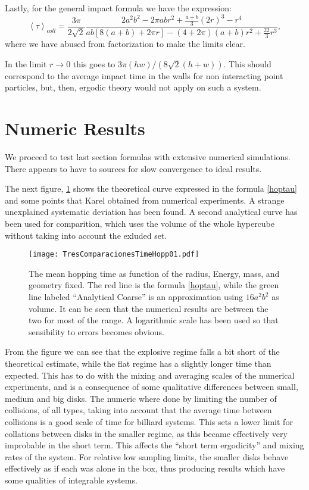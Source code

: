 \documentclass[a4paper,10pt, jcp, aps, preprint]{revtex4-1}
\newcommand{\mean}[1]{\left \langle #1 \right \rangle}
\begin{document}
Lastly, for the general impact formula we have the expression:
\begin{equation}
 \mean{\tau}_{coll} = 	
\frac{3 \pi}{2\sqrt{2}}
\frac { 2a^{2} b^{2}  -  2\pi a b r^{2} + \frac{a+b}{3}(2r)^3 - r^4}
{ab[8(a+b)+2\pi r]- (4+2\pi)(a+b)r^2+\frac{22}{3} r^3},
\end{equation}
where we have abused from factorization to make the limits clear.

In the limit $r\rightarrow 0$ this goes to $3 \pi (hw)/(8\sqrt{2}(h+w))$.
This should correspond to the average impact time in the walls
for non interacting point particles, 
but, then, ergodic theory would not apply
on such a system. 

\section{Numeric Results}

We proceed to test last section formulas with
extensive numerical simulations. There appears to have to
sources for slow convergence to ideal results.

The next figure, \ref{MeanHopp01} shows the theoretical curve 
expressed in the formula \ref{hoptau} and some points
that Karel obtained from numerical experiments. A strange unexplained
systematic
deviation has been found. A second analytical curve
has been used for comparition, which uses the volume of the
whole hypercube without taking into account the exluded
set. 

\begin{figure}[h]
  \centering
  \texttt{[image: TresComparacionesTimeHopp01.pdf]}
  \caption{The mean hopping time as function of the radius, Energy, mass, 
and geometry fixed.
The red line is the formula \ref{hoptau}, while the green line
labeled ``Analytical Coarse'' is an approximation using
 $16a^2b^2$ as volume. It can be seen that the numerical results
are between the two for most of the range.
A logarithmic scale
has been used so that sensibility to errors becomes obvious.}\label{MeanHopp01}
\end{figure}

From the figure we can see that the explosive regime falls a bit short of
the theoretical estimate, while  the flat regime has a slightly longer
time than expected. This has to do with the mixing and averaging scales
of the numerical experiments, and is a consequence of some
qualitative differences between small, medium and big disks. The numeric where done
by limiting the number of collisions, of all types, taking into account
that the average time between collisions is a good scale of time
for billiard systems. This sets a lower limit for collations between
disks in the smaller regime, as this became effectively very
improbable in the short term. This affects the ``short term ergodicity'' and
mixing rates of the system. For relative low sampling limits, the
smaller disks behave effectively as if each was alone in the box, thus
producing results which have some qualities of integrable systems. 
\end{document}
